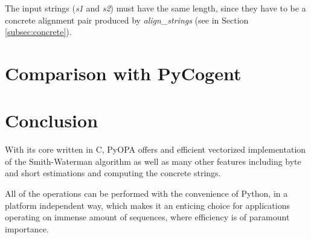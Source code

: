 \documentclass[12pt]{article}
\newcommand{\pp}{PyOPA}
\begin{document}
The input strings (\emph{s1} and \emph{s2}) must have the same length, since they have to be a concrete alignment pair produced by \emph{align\_strings} (see in Section \ref{subsec:concrete}).

\section{Comparison with PyCogent}
\label{sec:compCogent}

\section{Conclusion}
\label{sec:concl}

With its core written in C, \pp{} offers and efficient vectorized implementation of the Smith-Waterman algorithm as well as many other features including byte and short estimations and computing the concrete strings.

All of the operations can be performed with the convenience of Python, in a platform independent way, which makes it an enticing choice for applications operating on immense amount of sequences, where efficiency is of paramount importance.
\end{document}
